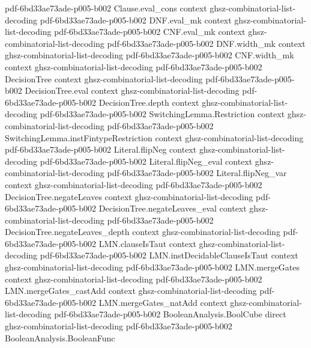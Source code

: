 \begin{lemma}
  {pdf-6bd33ae73ade-p005-b002}
\proofstep
  {Clause.eval_cons}
  {context}
  {ghsz-combinatorial-list-decoding}
  {pdf-6bd33ae73ade-p005-b002}
\proofstep
  {DNF.eval_mk}
  {context}
  {ghsz-combinatorial-list-decoding}
  {pdf-6bd33ae73ade-p005-b002}
\proofstep
  {CNF.eval_mk}
  {context}
  {ghsz-combinatorial-list-decoding}
  {pdf-6bd33ae73ade-p005-b002}
\proofstep
  {DNF.width_mk}
  {context}
  {ghsz-combinatorial-list-decoding}
  {pdf-6bd33ae73ade-p005-b002}
\proofstep
  {CNF.width_mk}
  {context}
  {ghsz-combinatorial-list-decoding}
  {pdf-6bd33ae73ade-p005-b002}
\proofstep
  {DecisionTree}
  {context}
  {ghsz-combinatorial-list-decoding}
  {pdf-6bd33ae73ade-p005-b002}
\proofstep
  {DecisionTree.eval}
  {context}
  {ghsz-combinatorial-list-decoding}
  {pdf-6bd33ae73ade-p005-b002}
\proofstep
  {DecisionTree.depth}
  {context}
  {ghsz-combinatorial-list-decoding}
  {pdf-6bd33ae73ade-p005-b002}
\proofstep
  {SwitchingLemma.Restriction}
  {context}
  {ghsz-combinatorial-list-decoding}
  {pdf-6bd33ae73ade-p005-b002}
\proofstep
  {SwitchingLemma.instFintypeRestriction}
  {context}
  {ghsz-combinatorial-list-decoding}
  {pdf-6bd33ae73ade-p005-b002}
\proofstep
  {Literal.flipNeg}
  {context}
  {ghsz-combinatorial-list-decoding}
  {pdf-6bd33ae73ade-p005-b002}
\proofstep
  {Literal.flipNeg_eval}
  {context}
  {ghsz-combinatorial-list-decoding}
  {pdf-6bd33ae73ade-p005-b002}
\proofstep
  {Literal.flipNeg_var}
  {context}
  {ghsz-combinatorial-list-decoding}
  {pdf-6bd33ae73ade-p005-b002}
\proofstep
  {DecisionTree.negateLeaves}
  {context}
  {ghsz-combinatorial-list-decoding}
  {pdf-6bd33ae73ade-p005-b002}
\proofstep
  {DecisionTree.negateLeaves_eval}
  {context}
  {ghsz-combinatorial-list-decoding}
  {pdf-6bd33ae73ade-p005-b002}
\proofstep
  {DecisionTree.negateLeaves_depth}
  {context}
  {ghsz-combinatorial-list-decoding}
  {pdf-6bd33ae73ade-p005-b002}
\proofstep
  {LMN.clauseIsTaut}
  {context}
  {ghsz-combinatorial-list-decoding}
  {pdf-6bd33ae73ade-p005-b002}
\proofstep
  {LMN.instDecidableClauseIsTaut}
  {context}
  {ghsz-combinatorial-list-decoding}
  {pdf-6bd33ae73ade-p005-b002}
\proofstep
  {LMN.mergeGates}
  {context}
  {ghsz-combinatorial-list-decoding}
  {pdf-6bd33ae73ade-p005-b002}
\proofstep
  {LMN.mergeGates_castAdd}
  {context}
  {ghsz-combinatorial-list-decoding}
  {pdf-6bd33ae73ade-p005-b002}
\proofstep
  {LMN.mergeGates_natAdd}
  {context}
  {ghsz-combinatorial-list-decoding}
  {pdf-6bd33ae73ade-p005-b002}
\proofstep
  {BooleanAnalysis.BoolCube}
  {direct}
  {ghsz-combinatorial-list-decoding}
  {pdf-6bd33ae73ade-p005-b002}
\proofstep
  {BooleanAnalysis.BooleanFunc}

\end{lemma}
